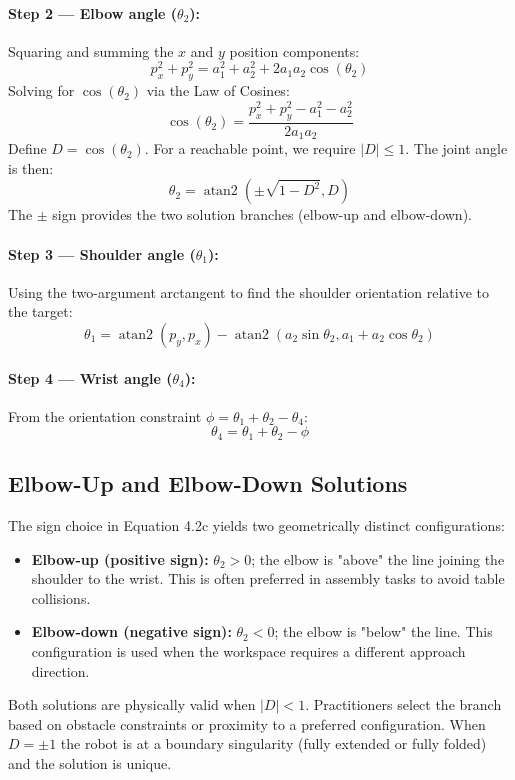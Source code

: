 \documentclass{article}
\begin{document}
\paragraph{Step 2 --- Elbow angle ($\theta_2$):}
Squaring and summing the $x$ and $y$ position components:
\begin{equation}
p_x^2 + p_y^2 = a_1^2 + a_2^2 + 2a_1a_2\cos(\theta_2) \tag{4.2a}
\end{equation}
Solving for $\cos(\theta_2)$ via the Law of Cosines:
\begin{equation}
\cos(\theta_2) = \frac{p_x^2 + p_y^2 - a_1^2 - a_2^2}{2a_1a_2} \tag{4.2b}
\end{equation}
Define $D = \cos(\theta_2)$. For a reachable point, we require $|D| \leq 1$. The joint angle is then:
\begin{equation}
\theta_2 = \operatorname{atan2}\left(\pm\sqrt{1 - D^2}, D\right) \tag{4.2c}
\end{equation}
The $\pm$ sign provides the two solution branches (elbow-up and elbow-down).

\paragraph{Step 3 --- Shoulder angle ($\theta_1$):}
Using the two-argument arctangent to find the shoulder orientation relative to the target:
\begin{equation}
\theta_1 = \operatorname{atan2}(p_y, p_x) - \operatorname{atan2}(a_2\sin\theta_2, a_1 + a_2\cos\theta_2) \tag{4.3}
\end{equation}

\paragraph{Step 4 --- Wrist angle ($\theta_4$):}
From the orientation constraint $\phi = \theta_1 + \theta_2 - \theta_4$:
\begin{equation}
\theta_4 = \theta_1 + \theta_2 - \phi \tag{4.4}
\end{equation}

\subsection{Elbow-Up and Elbow-Down Solutions}
The sign choice in Equation 4.2c yields two geometrically distinct configurations:
\begin{itemize}
    \item \textbf{Elbow-up (positive sign):} $\theta_2 > 0$; the elbow is "above" the line joining the shoulder to the wrist. This is often preferred in assembly tasks to avoid table collisions.
    \item \textbf{Elbow-down (negative sign):} $\theta_2 < 0$; the elbow is "below" the line. This configuration is used when the workspace requires a different approach direction.
\end{itemize}
Both solutions are physically valid when $|D| < 1$. Practitioners select the branch based on obstacle constraints or proximity to a preferred configuration. When $D = \pm 1$ the robot is at a boundary singularity (fully extended or fully folded) and the solution is unique.
\end{document}
